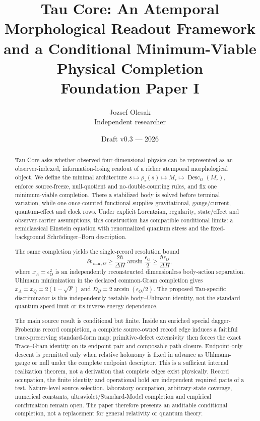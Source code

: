 \documentclass[11pt]{article}
\title{\textbf{Tau Core: An Atemporal Morphological Readout Framework and a Conditional Minimum-Viable Physical Completion}\\
\large Foundation Paper I}
\author{Jozsef Olcsak\\
\small Independent researcher}
\date{Draft v0.3 --- 2026}
\newcommand{\Desc}{\operatorname{Desc}}
\begin{document}
\maketitle

\begin{abstract}
Tau Core asks whether observed four-dimensional physics can be represented as
an observer-indexed, information-losing readout of a richer atemporal
morphological object.  We define the minimal architecture
\(s\mapsto\rho_\tau(s)\mapsto M_\tau\mapsto\Desc_O(M_\tau)\), enforce
source-freeze, null-quotient and no-double-counting rules, and fix one
minimum-viable completion.  There a stabilized body is solved before terminal
variation, while one once-counted functional supplies gravitational,
gauge/current, quantum-effect and clock rows.  Under explicit Lorentzian,
regularity, state/effect and observer-carrier assumptions, this construction
has compatible conditional limits: a semiclassical Einstein equation with
renormalized quantum stress and the fixed-background
Schr\"odinger--Born description.

The same completion yields the single-record resolution bound
\[
  \delta t_{\min,O}\geq
  \frac{2\hbar}{\Delta H}\arcsin\frac{\epsilon_O}{2}
  \geq\frac{\hbar\epsilon_O}{\Delta H},
\]
where \(x_A=\epsilon_O^2\) is an independently reconstructed dimensionless
body-action separation.  Uhlmann minimization in the declared common-Gram
completion gives \(x_A=x_Q=2(1-\sqrt F)\) and
\(D_B=2\arcsin(\epsilon_O/2)\).  The proposed Tau-specific discriminator is
this independently testable body--Uhlmann identity, not the standard quantum
speed limit or its inverse-energy dependence.

The main source result is conditional but finite.  Inside an enriched
special dagger-Frobenius record completion, a complete source-owned record
edge induces a faithful trace-preserving standard-form map; primitive-defect
extensivity then forces the exact Trace--Gram identity on its endpoint pair
and composable path closure.  Endpoint-only descent is permitted only when
relative holonomy is fixed in advance as Uhlmann-gauge or null under the
complete endpoint descriptor.  This is a sufficient internal realization
theorem, not a derivation that complete edges exist physically.  Record
occupation, the finite identity and operational hold are independent required
parts of a test.  Nature-level source selection, laboratory occupation,
arbitrary-state coverage, numerical constants, ultraviolet/Standard-Model
completion and empirical confirmation remain open.  The paper therefore
presents an auditable conditional completion, not a replacement for general
relativity or quantum theory.
\end{abstract}
\end{document}
